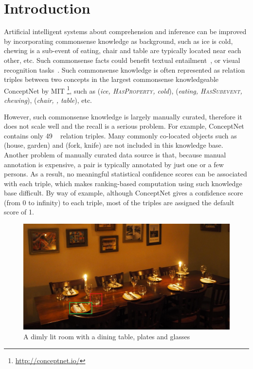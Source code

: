 \section{Introduction}
Artificial intelligent systems about comprehension and inference 
can be improved by incorporating commonsense knowledge as background, 
such as ice is cold, 
chewing is a sub-event of eating, 
chair and table are typically located near each other, etc. 
Such commonsense facts could benefit textual entailment~\cite{dagan2009recognizing,bowman2015large}, or visual recognition tasks~\cite{zhu2014reasoning}.
Such commonsense knowledge is often represented as relation triples
between two concepts in the largest commonsense knowledgeable ConceptNet by MIT \cite{speer2012representing}  \footnote{\url{http://conceptnet.io/}}, 
such as (\textit{ice, \textsc{HasProperty}, cold}), 
(\textit{eating, \textsc{HasSubevent}, chewing}), 
(\textit{chair, \lnear, table}), etc. 

However, such commonsense knowledge is largely manually curated, therefore it does not scale well and the recall is a serious problem.
For example, ConceptNet contains only 49 \lnear~
relation triples. 
Many commonly co-located objects such as (house, garden) and 
(fork, knife) are not included in this knowledge base. 
Another problem of manually curated data source is that, because manual
annotation is expensive, a pair is typically annotated by just one 
or a few persons. 
As a result, no meaningful statistical confidence scores can be
associated with each triple, which makes ranking-based 
computation using such knowledge base difficult. 
By way of example, although ConceptNet gives a confidence
score (from 0 to infinity) to each triple, most of the triples are assigned the default
score of 1.

\begin{figure}[th]
\center
\includegraphics[width=\columnwidth]{dim-table.jpg}
\caption{A dimly lit room with a dining table, plates and glasses}
\label{fig:dim}
\end{figure}

